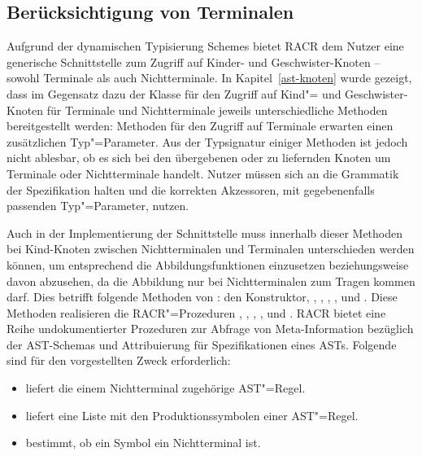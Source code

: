 \subsection{Berücksichtigung von Terminalen}

Aufgrund der dynamischen Typisierung Schemes bietet RACR dem Nutzer eine generische Schnittstelle zum Zugriff auf Kinder- und Geschwister-Knoten – sowohl Terminale als auch Nichtterminale. In Kapitel~\ref{ast-knoten} wurde gezeigt, dass im Gegensatz dazu der Klasse  für den Zugriff auf Kind"= und Geschwister-Knoten für Terminale und Nichtterminale jeweils unterschiedliche Methoden bereitgestellt werden: Methoden für den Zugriff auf Terminale erwarten einen zusätzlichen Typ"=Parameter. Aus der Typsignatur einiger Methoden ist jedoch nicht ablesbar, ob es sich bei den übergebenen oder zu liefernden Knoten um Terminale oder Nichtterminale handelt. Nutzer müssen sich an die Grammatik der Spezifikation halten und die korrekten Akzessoren, mit gegebenenfalls passenden Typ"=Parameter, nutzen.

Auch in der Implementierung der Schnittstelle muss innerhalb dieser Methoden bei Kind-Knoten zwischen Nichtterminalen und Terminalen unterschieden werden können, um entsprechend die Abbildungsfunktionen einzusetzen beziehungsweise davon abzusehen, da die Abbildung nur bei Nichtterminalen zum Tragen kommen darf. Dies betrifft folgende Methoden von : den Konstruktor, , , , ,  und . Diese Methoden realisieren die RACR"=Prozeduren , , , ,  und . RACR bietet eine Reihe undokumentierter Prozeduren zur Abfrage von Meta-Information bezüglich der AST-Schemas und Attribuierung für Spezifikationen eines ASTs. Folgende sind für den vorgestellten Zweck erforderlich:

\begin{itemize}
	\item {} liefert die einem Nichtterminal zugehörige AST"=Regel.
	\item {} liefert eine Liste mit den Produktionssymbolen einer AST"=Regel.
	\item {} bestimmt, ob ein Symbol ein Nichtterminal ist.
\end{itemize}

